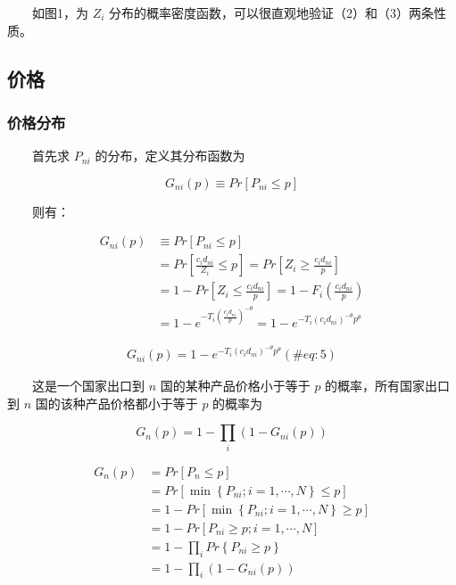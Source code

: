 \documentclass[]{tufte-handout}
\begin{document}
　　如图1，为 \(Z_i\)
分布的概率密度函数，可以很直观地验证（2）和（3）两条性质。

\hypertarget{ux4ef7ux683c}{%
\subsection{价格}\label{ux4ef7ux683c}}

\hypertarget{ux4ef7ux683cux5206ux5e03}{%
\subsubsection{价格分布}\label{ux4ef7ux683cux5206ux5e03}}

　　首先求 \(P_{ni}\) 的分布，定义其分布函数为

\[
G_{ni}(p) \equiv Pr[P_{ni} \le p]  
\]

　　则有：

\begin{marginfigure}
\[
\begin{aligned}
G_{ni}(p) & \equiv Pr[P_{ni} \le p] \\  
&= Pr[\frac {{c_i}d_{ni}}{Z_i} \le p]  = Pr[Z_i \geq \frac {{c_i}d_{ni}}{p}] \\ & = 1-Pr[Z_i \le \frac {{c_i}d_{ni}}{p}] = 1 - F_i(\frac {{c_i}d_{ni}}{p}) \\  
&= 1 - e^{-T_{i} (\frac {{c_i}d_{ni}}{p})^{-\theta}} = 1-e^{-T_{i} ( {{c_i}d_{ni}})^{-\theta}p^{\theta}} 
\end{aligned}
\]
\end{marginfigure}

\begin{align}
G_{ni}(p) =1-e^{-T_{i} ( {{c_i}d_{ni}})^{-\theta}p^{\theta}}  (\#eq:5)
\end{align}

　　这是一个国家出口到 \(n\) 国的某种产品价格小于等于 \(p\)
的概率，所有国家出口到 \(n\) 国的该种产品价格都小于等于 \(p\) 的概率为

\[
G_n(p) =1-\prod_{i}{(1-G_{ni}\left(p\right))}
\]

\begin{marginfigure}
\[
\begin{aligned}
G_n(p) &= Pr[P_n \le p] \\ &=Pr[ \min \left\{P_{n i} ; i=1, \cdots, N\right\} \le p] \\ &= 1 - Pr[ \min \left\{P_{n i} ; i=1, \cdots, N\right\} \geq p] \\ &= 1- Pr[ P_{n i}  \geq p; i=1, \cdots, N]\\ &=1-\prod_{i}Pr\left\{P_{ni}\geq p\right\} \\ &=1-\prod_{i}{(1-G_{ni}\left(p\right))}
\end{aligned}
\]
\end{marginfigure}
\end{document}
